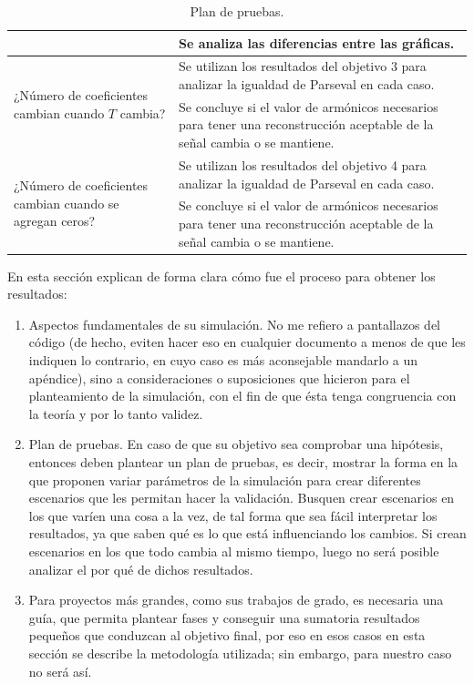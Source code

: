 \documentclass[12pt]{article}
\begin{document}
\begin{table}[H]
\begin{center}
\begin{tabular}{| m{5cm} | m{12cm} |}
                        & Se analiza las diferencias entre las gráficas. \\ \hline
                    \multirow{2}{4.5cm}{¿Número de coeficientes cambian cuando $T$ cambia?}
                        & Se utilizan los resultados del objetivo 3 para analizar la igualdad de Parseval en cada caso. \\ \cline{2-2}
                        & Se concluye si el valor de armónicos necesarios para tener una reconstrucción aceptable de la señal cambia o se mantiene. \\ \hline
                    \multirow{2}{4.5cm}{¿Número de coeficientes cambian cuando se agregan ceros?}
                        & Se utilizan los resultados del objetivo 4 para analizar la igualdad de Parseval en cada caso. \\ \cline{2-2}
                        & Se concluye si el valor de armónicos necesarios para tener una reconstrucción aceptable de la señal cambia o se mantiene. \\ \hline
                \end{tabular}
            \end{center}
            \caption{Plan de pruebas.}
        \end{table}

    En esta sección explican de forma clara cómo fue el proceso para obtener los resultados:
    \begin{enumerate}
        \item Aspectos fundamentales de su simulación. No me refiero a pantallazos del código 
        (de hecho, eviten hacer eso en cualquier documento a menos de que les indiquen 
        lo contrario, en cuyo caso es más aconsejable mandarlo a un apéndice), sino a 
        consideraciones o suposiciones que hicieron para el planteamiento de la simulación, 
        con el fin de que ésta tenga congruencia con la teoría y por lo tanto validez. 

        \item Plan de pruebas. En caso de que su objetivo sea comprobar una hipótesis, entonces 
        deben plantear un plan de pruebas, es decir, mostrar la forma en la que proponen 
        variar parámetros de la simulación para crear diferentes escenarios que les permitan 
        hacer la validación. Busquen crear escenarios en los que varíen una cosa a la vez, 
        de tal forma que sea fácil interpretar los resultados, ya que saben qué es lo que está 
        influenciando los cambios. Si crean escenarios en los que todo cambia al mismo 
        tiempo, luego no será posible analizar el por qué de dichos resultados. 

        \item Para proyectos más grandes, como sus trabajos de grado, es necesaria una guía, 
        que permita plantear fases y conseguir una sumatoria resultados pequeños que 
        conduzcan al objetivo final, por eso en esos casos en esta sección se describe la 
        metodología utilizada; sin embargo, para nuestro caso no será así. 
    \end{enumerate}
\end{document}

